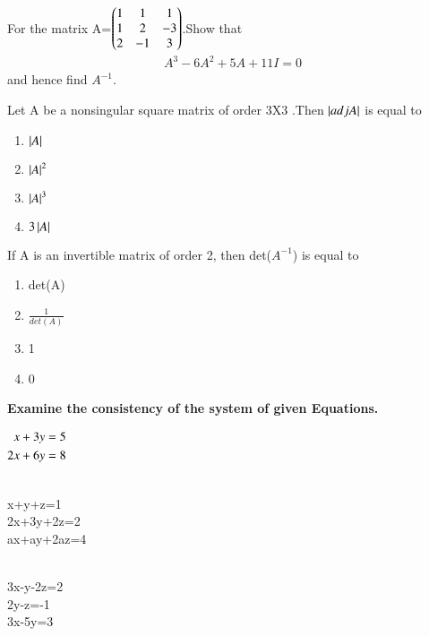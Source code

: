 \item For the matrix A=$\begin{pmatrix}1&1&1 \\ 1&2&-3 \\ 2&-1&3\end{pmatrix}$.Show that \begin{align}
    A^3-6A^2+5A+11I=0\label{eq:det/49/1}
\end{align} and hence find $A^{-1}$.
\solution 

\item Let A be a nonsingular square matrix of order 3X3 .Then $\left\vert adjA\right\vert$ is equal to 
\begin{enumerate}
\item $\left\vert A\right\vert$
\item $\left\vert A\right\vert^2$
\item $\left\vert A\right\vert^3$
\item $3\left\vert A\right\vert$
\end{enumerate}
\item If A is an invertible matrix of order 2, then det($A^{-1}$) is equal to 
\begin{enumerate}
\item det(A)
\item $\frac{1}{det(A)}$
\item 1
\item 0
\end{enumerate}
\textbf{Examine the consistency of the system of given Equations.}
\item $\begin{alignedat}[t]{2}
x+3y&=5 
\\
2x+6y&=8 
\end{alignedat}$\\
\\
\solution 

\item x+y+z=1\\ 2x+3y+2z=2\\ax+ay+2az=4\\
\\
\solution 

\item 3x-y-2z=2 \\ 2y-z=-1 \\ 3x-5y=3\\
